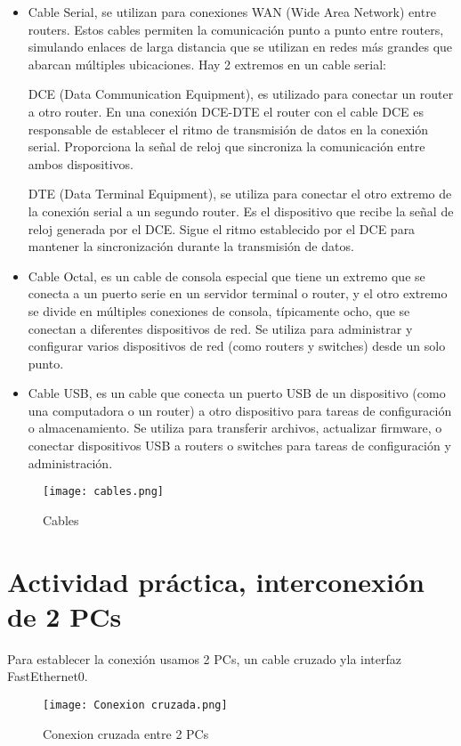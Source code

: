 \documentclass{article}
\begin{document}
\begin{itemize}
    \item Cable Serial, se utilizan para conexiones WAN (Wide Area Network) entre routers. Estos cables permiten la comunicación punto a punto entre routers, simulando enlaces de larga distancia que se utilizan en redes más grandes que abarcan múltiples ubicaciones. Hay 2 extremos en un cable serial: 

    DCE (Data Communication Equipment), es utilizado para conectar un router a otro router. En una conexión DCE-DTE el router con el cable DCE es responsable de establecer el ritmo de transmisión de datos en la conexión serial. Proporciona la señal de reloj que sincroniza la comunicación entre ambos dispositivos.

    DTE (Data Terminal Equipment), se utiliza para conectar el otro extremo de la conexión serial a un segundo router. Es el dispositivo que recibe la señal de reloj generada por el DCE. Sigue el ritmo establecido por el DCE para mantener la sincronización durante la transmisión de datos.

    \item Cable Octal, es un cable de consola especial que tiene un extremo que se conecta a un puerto serie en un servidor terminal o router, y el otro extremo se divide en múltiples conexiones de consola, típicamente ocho, que se conectan a diferentes dispositivos de red. Se utiliza para administrar y configurar varios dispositivos de red (como routers y switches) desde un solo punto.

    \item Cable USB, es un cable que conecta un puerto USB de un dispositivo (como una computadora o un router) a otro dispositivo para tareas de configuración o almacenamiento. Se utiliza para transferir archivos, actualizar firmware, o conectar dispositivos USB a routers o switches para tareas de configuración y administración.
\end{itemize}
\begin{figure}[h]
  \centering
  \texttt{[image: cables.png]}
  \caption{Cables}
\end{figure}
\section{Actividad práctica, interconexión de 2 PCs}

Para establecer la conexión usamos 2 PCs, un cable cruzado yla interfaz FastEthernet0. 
\begin{figure}[h]
  \centering
  \texttt{[image: Conexion cruzada.png]}
  \caption{Conexion cruzada entre 2 PCs}
\end{figure}
\end{document}
